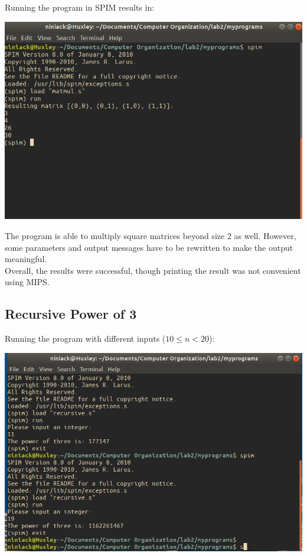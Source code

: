 \documentclass[twocolumn]{article}
\begin{document}
Running the program in SPIM results in: 

\begin{center}
  \includegraphics[scale=0.45]{Lab2-images/matmul.png}
\end{center}

The program is able to multiply square matrices beyond size 2 as well. However, some parameters and output messages have to be rewritten to make the output meaningful. \\

Overall, the results were successful, though printing the result was not convenient using MIPS. 

\newpage

\subsection{Recursive Power of 3}

Running the program with different inputs ($10\leq n<20$): 

\begin{center}
  \includegraphics[scale=0.45]{Lab2-images/recursive.png}
\end{center}
\end{document}

